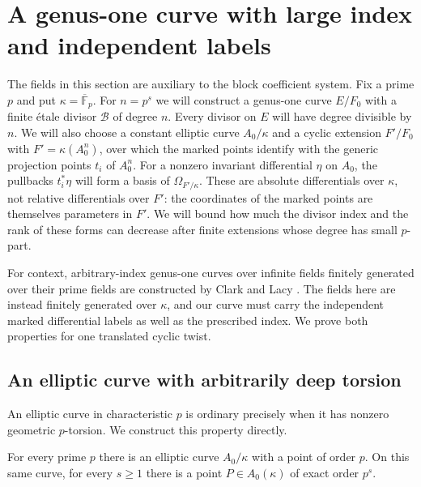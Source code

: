 \section{A genus-one curve with large index and independent labels}
\label{sec:twist}

The fields in this section are auxiliary to the block coefficient system.
Fix a prime $p$ and put $\kappa=\overline{\mathbb F}_p$.  For $n=p^s$ we
will construct a genus-one curve $E/F_0$ with a finite \'{e}tale divisor
$\mathcal B$ of degree $n$. Every divisor on $E$ will have degree
divisible by $n$. We will also choose a constant elliptic curve
$A_0/\kappa$ and a cyclic extension $F'/F_0$ with
$F'=\kappa(A_0^n)$, over which the marked points identify with the
generic projection points $t_i$ of $A_0^n$. For a nonzero invariant
differential $\eta$ on $A_0$, the pullbacks $t_i^*\eta$ will form a
basis of $\Omega_{F'/\kappa}$. These are absolute differentials over
$\kappa$, not relative differentials over $F'$: the coordinates of
the marked points are themselves parameters in $F'$. We will bound
how much the divisor index and the rank of these forms can decrease
after finite extensions whose degree has small $p$-part.

For context, arbitrary-index genus-one curves over infinite fields
finitely generated over their prime fields are constructed by Clark and
Lacy \cite{ClarkLacy2019}. The fields here are instead finitely
generated over $\kappa$, and our curve must carry the independent
marked differential labels as well as the prescribed index. We prove
both properties for one translated cyclic twist.

\subsection{An elliptic curve with arbitrarily deep torsion}

An elliptic curve in characteristic $p$ is ordinary precisely when it
has nonzero geometric $p$-torsion.  We construct this property directly.

\begin{lemma}\label{lem:ordinary-elliptic}
For every prime $p$ there is an elliptic curve $A_0/\kappa$ with a point
of order $p$.  On this same curve, for every $s\geq 1$ there is a point
$P\in A_0(\kappa)$ of exact order $p^s$.
\end{lemma}

